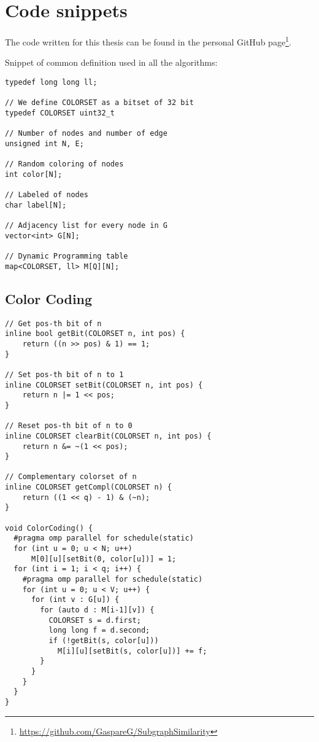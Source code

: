 

\chapter{Code snippets}
  
The code written for this thesis can be found in the personal GitHub page\footnote{\url{https://github.com/GaspareG/SubgraphSimilarity}}.\medskip

Snippet of common definition used in all the algorithms:

\begin{lstlisting}
typedef long long ll;

// We define COLORSET as a bitset of 32 bit
typedef COLORSET uint32_t

// Number of nodes and number of edge
unsigned int N, E;

// Random coloring of nodes
int color[N];

// Labeled of nodes
char label[N];

// Adjacency list for every node in G
vector<int> G[N];

// Dynamic Programming table
map<COLORSET, ll> M[Q][N];
\end{lstlisting}

\clearpage


\section*{Color Coding}

\begin{lstlisting}
// Get pos-th bit of n
inline bool getBit(COLORSET n, int pos) { 
	return ((n >> pos) & 1) == 1; 
}

// Set pos-th bit of n to 1
inline COLORSET setBit(COLORSET n, int pos) { 
	return n |= 1 << pos; 
}

// Reset pos-th bit of n to 0
inline COLORSET clearBit(COLORSET n, int pos) { 
	return n &= ~(1 << pos); 
}

// Complementary colorset of n
inline COLORSET getCompl(COLORSET n) { 
	return ((1 << q) - 1) & (~n); 
}

void ColorCoding() {
  #pragma omp parallel for schedule(static)
  for (int u = 0; u < N; u++) 
	  M[0][u][setBit(0, color[u])] = 1;
  for (int i = 1; i < q; i++) {
    #pragma omp parallel for schedule(static)
    for (int u = 0; u < V; u++) {
      for (int v : G[u]) {
        for (auto d : M[i-1][v]) {
          COLORSET s = d.first;
          long long f = d.second;
          if (!getBit(s, color[u]))
            M[i][u][setBit(s, color[u])] += f;
        }
      }
    }
  }
}
\end{lstlisting}


